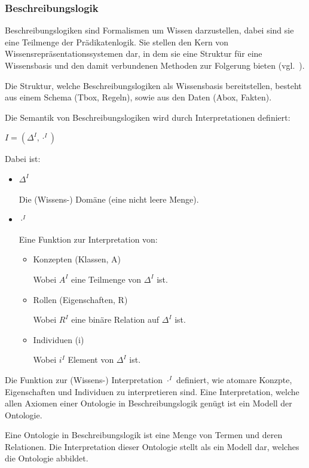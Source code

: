 \subsubsection{Beschreibungslogik}
\label{subsubsection:beschreibungslogik}
Beschreibungslogiken sind Formalismen um Wissen darzustellen, dabei sind sie eine Teilmenge der Prädikatenlogik. Sie stellen den Kern von Wissensrepräsentationssystemen dar, in dem sie eine Struktur für eine Wissensbasis und den damit verbundenen Methoden zur Folgerung bieten (vgl.~\cite{dl:baader2003}).

Die Struktur, welche Beschreibungslogiken als Wissensbasis bereitstellen, besteht aus einem Schema (Tbox, Regeln), sowie aus den Daten (Abox, Fakten).

Die Semantik von Beschreibungslogiken wird durch Interpretationen definiert:

\noindent\hspace*{16mm} $ I = (\Delta^I, \cdot^I) $

Dabei ist:
\begin{itemize}
\item $ \Delta^I $

    Die (Wissens-) Domäne (eine nicht leere Menge).

\item $ \cdot^I $

    Eine Funktion zur Interpretation von:
    \begin{itemize}
        \item Konzepten (Klassen, A)

            Wobei $ A^I $ eine Teilmenge von $ \Delta^I $ ist.
        \item Rollen (Eigenschaften, R)

            Wobei $ R^I $ eine binäre Relation auf $ \Delta^I $ ist.
        \item Individuen (i)

            Wobei $ i^I $ Element von $ \Delta^I $ ist.
    \end{itemize}
\end{itemize}

Die Funktion zur (Wissens-) Interpretation $ \cdot^I $ definiert, wie atomare Konzpte, Eigenschaften und Individuen zu interpretieren sind. Eine Interpretation, welche allen Axiomen einer Ontologie in Beschreibungslogik genügt ist ein Modell der Ontologie.

Eine Ontologie in Beschreibungslogik ist eine Menge von Termen und deren Relationen. Die Interpretation dieser Ontologie stellt als ein Modell dar, welches die Ontologie abbildet.

